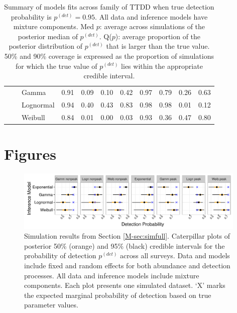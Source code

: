 \documentclass[useAMS,usenatbib,referee,12pt]{article}
\newcommand{\pdet}{p^{(det)}}
\begin{document}
\begin{table}[ht]
\begin{tabular}{l|l|l|cccc|cccc}
\cline{2-11}
& \parbox[t]{2mm}{}  & Gamma & 0.91 & 0.09 & 0.10 & 0.42 & 0.97 & 0.79 & 0.26 & 0.63 \\ 
   &  & Lognormal & 0.94 & 0.40 & 0.43 & 0.83 & 0.98 & 0.98 & 0.01 & 0.12 \\ 
   &  & Weibull & 0.84 & 0.01 & 0.00 & 0.03 & 0.93 & 0.36 & 0.47 & 0.80 \\ 
   \hline
\end{tabular}
\caption{Summary of models fits across family of TTDD when true detection probability is $\pdet = 0.95$.
All data and inference models have mixture components.
Med $p$: average across simulations of the posterior median of $\pdet$.  
Q($p$): average proportion of the posterior distribution of $\pdet$ that is larger than the true value.  
50\% and 90\% coverage is expressed as the proportion of simulations for which the true value of $\pdet$ lies within the appropriate credible interval.}
\label{tbl:fam95}
\end{table}

\FloatBarrier



\section{Figures}

\begin{figure}[h!]\centering
\includegraphics[width=0.98\textwidth]{pdet_cater_family} %
\caption{\label{pdet_cater_family}  Simulation results from Section \ref{M-sec:simfull}.
Caterpillar plots of posterior 50\% (orange) and 95\% (black) credible intervals for the probability of detection $\pdet$ across all surveys.
Data and models include fixed and random effects for both abundance and detection processes.
All data and inference models include mixture components.  
Each plot presents one simulated dataset.  
`X' marks the expected marginal probability of detection based on true parameter values.}
\end{figure}
\end{document}
